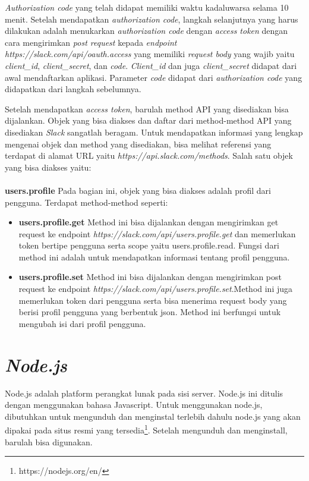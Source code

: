 \textit{Authorization code} yang telah didapat memiliki waktu kadaluwarsa selama 10 menit. Setelah mendapatkan \textit{authorization code}, langkah selanjutnya yang harus dilakukan adalah menukarkan \textit{authorization code} dengan \textit{access token} dengan cara mengirimkan \textit{post request} kepada \textit{endpoint} \textit{https://slack.com/api/oauth.access} yang memiliki \textit{request body} yang wajib yaitu \textit{client\_id}, \textit{client\_secret}, dan \textit{code}. \textit{Client\_id} dan juga \textit{client\_secret} didapat dari awal mendaftarkan aplikasi. Parameter \textit{code} didapat dari \textit{authorization code} yang didapatkan dari langkah sebelumnya.

Setelah mendapatkan \textit{access token}, barulah method API yang disediakan bisa dijalankan.
Objek yang bisa diakses dan daftar dari method-method API yang disediakan \textit{Slack} sangatlah beragam. Untuk mendapatkan informasi yang lengkap mengenai objek dan method yang disediakan, bisa melihat referensi yang terdapat di alamat URL yaitu \textit{https://api.slack.com/methods}. Salah satu objek yang bisa diakses yaitu:\\
\\
\textbf{users.profile}
Pada bagian ini, objek yang bisa diakses adalah profil dari pengguna. Terdapat method-method seperti:
\begin{itemize}
	\item \textbf{users.profile.get}
	Method ini bisa dijalankan dengan mengirimkan get request ke endpoint \textit{https://slack.com/api/users.profile.get} dan memerlukan token bertipe pengguna serta scope yaitu users.profile.read. Fungsi dari method ini adalah untuk mendapatkan informasi tentang profil pengguna. 
	\item \textbf{users.profile.set}
	Method ini bisa dijalankan dengan mengirimkan post request ke endpoint \textit{	https://slack.com/api/users.profile.set}.Method ini juga memerlukan token dari pengguna serta bisa menerima request body yang berisi profil pengguna yang berbentuk json. Method ini berfungsi untuk mengubah isi dari profil pengguna. 
\end{itemize}


\section{\textit{Node.js}}
\label{sec:nodejs}
Node.js adalah platform perangkat lunak pada sisi server. Node.js ini ditulis dengan menggunakan bahasa Javascript. Untuk menggunakan node.js, dibutuhkan untuk mengunduh dan menginstal terlebih dahulu node.js yang akan dipakai pada situs resmi yang tersedia\footnote{https://nodejs.org/en/}. Setelah mengunduh dan menginstall, barulah bisa digunakan. 

